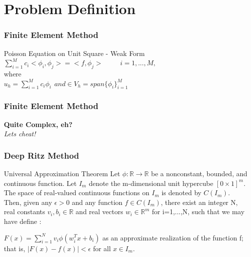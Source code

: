 \documentclass{beamer}
\newcommand{\R}{\mathbb{R}}
\begin{document}
\section{Problem Definition}
\begin{frame}
	\frametitle{Finite Element Method}	
	\begin{block}{Poisson Equation on Unit Square - Weak Form}		
		$\sum_{i=1}^{M} c_i <\phi_i,\phi_j> = <f,\phi_j> \hspace{30pt} i=1,...,M,$		
		\\where\\	
		 $u_h = \sum_{i=1}^{M} c_i \phi_i \hspace{5pt} and \in V_h=span\{\phi_i\}_{i=1}^{M}$		
	\end{block}	
\end{frame}

\begin{frame}
	\frametitle{Finite Element Method}
	
	\textbf{Quite Complex, eh?}\centering\\
	\textit{Lets cheat!}\centering\\
	
\end{frame}


\begin{frame}
	\frametitle{Deep Ritz Method}
	
	\begin{block}{Universal Approximation Theorem}
		Let $\phi:\R \to \R$ be a nonconstant, bounded, and continuous function. Let $I_m$ denote the m-dimensional unit hypercube $[0 \times 1]^m$. The space of real-valued continuous functions on $I_m$ is denoted by $C(I_m)$. Then, given any $\epsilon >0$ and any function $f \in C(I_m)$, there exist an integer N, real constants $v_i, b_i \in \R$ and real vectors $w_i \in \R^m$ for i=1,...,N, such that we may have define :
		
		$F(x) = \sum_{i=1}^{N} v_i \phi(w_{i}^{T}x + b_i)$
		as an approximate realization of the function f; that is,
		$|F(x)-f(x)| < \epsilon$
		for all $x\in I_m$. 
		
	\end{block}	
\end{frame}
\end{document}
